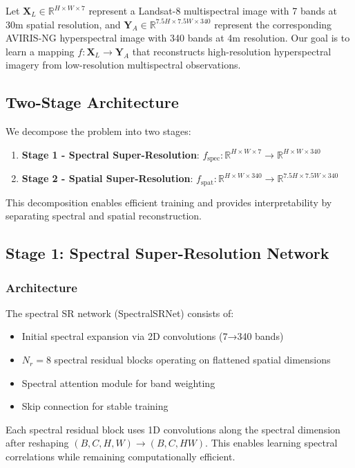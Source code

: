 \documentclass[]{spieman}
\begin{document}
Let $\mathbf{X}_L \in \mathbb{R}^{H \times W \times 7}$ represent a Landsat-8 multispectral image with 7 bands at 30m spatial resolution, and $\mathbf{Y}_A \in \mathbb{R}^{7.5H \times 7.5W \times 340}$ represent the corresponding AVIRIS-NG hyperspectral image with 340 bands at 4m resolution. Our goal is to learn a mapping $f: \mathbf{X}_L \rightarrow \mathbf{Y}_A$ that reconstructs high-resolution hyperspectral imagery from low-resolution multispectral observations.

\subsection{Two-Stage Architecture}

We decompose the problem into two stages:
\begin{enumerate}
\item \textbf{Stage 1 - Spectral Super-Resolution}: $f_{\text{spec}}: \mathbb{R}^{H \times W \times 7} \rightarrow \mathbb{R}^{H \times W \times 340}$
\item \textbf{Stage 2 - Spatial Super-Resolution}: $f_{\text{spat}}: \mathbb{R}^{H \times W \times 340} \rightarrow \mathbb{R}^{7.5H \times 7.5W \times 340}$
\end{enumerate}

This decomposition enables efficient training and provides interpretability by separating spectral and spatial reconstruction.

\subsection{Stage 1: Spectral Super-Resolution Network}

\subsubsection{Architecture}

The spectral SR network (SpectralSRNet) consists of:
\begin{itemize}
\item Initial spectral expansion via 2D convolutions (7→340 bands)
\item $N_r=8$ spectral residual blocks operating on flattened spatial dimensions
\item Spectral attention module for band weighting
\item Skip connection for stable training
\end{itemize}

Each spectral residual block uses 1D convolutions along the spectral dimension after reshaping $(B, C, H, W) \rightarrow (B, C, HW)$. This enables learning spectral correlations while remaining computationally efficient.
\end{document}
